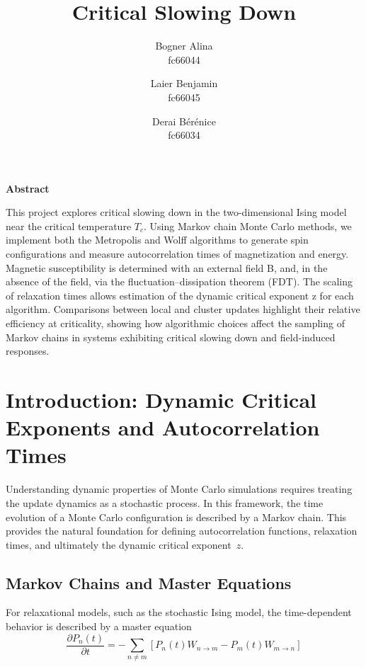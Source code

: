 \documentclass{article}
\title{Critical Slowing Down}
\author{
  Bogner Alina \\
  fc66044
  \and
  Laier Benjamin \\
  fc66045 
  \and 
  Derai Bérénice \\
  fc66034
  }
\begin{document}
\maketitle


\begin{center}
  \textbf{Abstract}
\end{center}
This project explores critical slowing down in the two-dimensional Ising model near the critical temperature $T_c$. Using Markov chain Monte Carlo methods, we implement both the Metropolis and Wolff algorithms to generate spin configurations and measure autocorrelation times of magnetization and energy. Magnetic susceptibility is determined with an external field B, and, in the absence of the field, via the fluctuation–dissipation theorem (FDT). The scaling of relaxation times allows estimation of the dynamic critical exponent 
z for each algorithm. Comparisons between local and cluster updates highlight their relative efficiency at criticality, showing how algorithmic choices affect the sampling of Markov chains in systems exhibiting critical slowing down and field-induced responses.


\tableofcontents



\section{Introduction: Dynamic Critical Exponents and Autocorrelation Times}

Understanding dynamic properties of Monte Carlo simulations requires treating the update dynamics as a stochastic process. In this framework, the time evolution of a Monte Carlo configuration is described by a Markov chain. This provides the natural foundation for defining autocorrelation functions, relaxation times, and ultimately the dynamic critical exponent~$z$.

\subsection{Markov Chains and Master Equations}

For relaxational models, such as the stochastic Ising model, the time-dependent
behavior is described by a master equation \cite{1}
\begin{equation}
\frac{\partial P_n(t)}{\partial t}
= - \sum_{n \neq m} \left[ P_n(t) W_{n \to m} - P_m(t) W_{m \to n} \right]
\end{equation}
\end{document}
